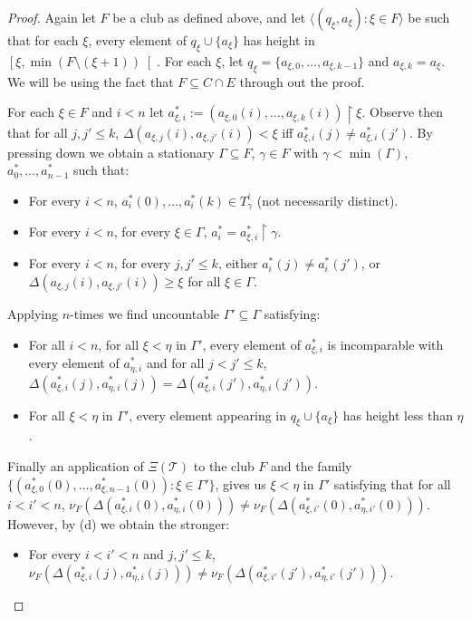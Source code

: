 \documentclass[10pt,a4paper]{amsart}
\theoremstyle{definition}
\newcommand{\seb}{\subseteq}
\newcommand{\setm}{\setminus}
\newcommand{\res}{\!\upharpoonright\!}
\newcommand{\tup}[1]{\langle#1\rangle}
\newcommand{\1}{\mathbf{1}}
\newcommand{\T}{\mathcal{T}}
\newcommand{\prop}{\Xi}
\begin{document}
\begin{proof}
  Again let $F$ be a club as defined above, and let
  $\tup{(q_{\xi},a_{\xi}) : \xi \in F}$ be such that
  for each $\xi$, every element of $q_{\xi} \cup \{a_{\xi}\}$ has height
  in $\left[\xi,\min(F\setm(\xi+1))\right[$. For each $\xi$,
  let $q_{\xi} = \{a_{\xi,0},\dots,a_{\xi,k-1}\}$ and
  $a_{\xi,k} = a_{\xi}$. We will be using the fact that
  $F \seb C \cap E$ through out the proof.

  For each $\xi \in F$ and $i < n$ let
  $a_{\xi,i}^{*} := (a_{\xi,0}(i),\dots,a_{\xi,k}(i))\res \xi$.
  Observe then that for all $j,j' \le k$,
  $\Delta(a_{\xi,j}(i),a_{\xi,j'}(i)) < \xi$ iff
  $a_{\xi,i}^{*}(j) \neq a_{\xi,i}^{*}(j')$. By pressing down
  we obtain a stationary $\Gamma \seb F$,
  $\gamma \in F$ with $\gamma < \min(\Gamma)$,
  $a^{*}_{0},\dots,a^{*}_{n-1}$ such that:
  \begin{itemize}
    \item[(a)] For every $i < n$, $a^{*}_{i}(0),\dots,a^{*}_{i}(k) \in
    T^{i}_{\gamma}$ (not necessarily distinct).
    \item[(b)] For every $i < n$, for every $\xi \in \Gamma$,
    $a^{*}_{i}  = a_{\xi,i}^{*}\res \gamma$.
    \item[(c)] For every $i < n$, for every $j,j' \le k$,
    either $a^{*}_{i}(j) \neq a^{*}_{i}(j')$, or
    $\Delta(a_{\xi,j}(i),a_{\xi,j'}(i)) \ge \xi$ for all
    $\xi \in \Gamma$.
  \end{itemize}
  Applying
   $n$-times we find uncountable
  $\Gamma' \seb \Gamma$ satisfying:
  \begin{itemize}
    \item[(d)] For all $i < n$, for all $\xi < \eta$ in $\Gamma'$,
    every element of $a^{*}_{\xi,i}$ is incomparable with every element
    of $a^{*}_{\eta,i}$ and for all $j < j' \le k$,
    $\Delta(a^{*}_{\xi,i}(j),a^{*}_{\eta,i}(j)) =
    \Delta(a^{*}_{\xi,i}(j'),a^{*}_{\eta,i}(j'))$.
    \item[(e)] For all $\xi < \eta$ in $\Gamma'$,
    every element appearing in $q_{\xi} \cup \{a_{\xi}\}$ has
    height less than $\eta$.
  \end{itemize}
  Finally an application of $\prop(\T)$ to the club $F$ and the family
  $\{(a^{*}_{\xi,0}(0),\dots,a^{*}_{\xi,n-1}(0)) : \xi \in \Gamma'\}$, gives us
  $\xi < \eta$ in $\Gamma'$ satisfying that for all $i < i' < n$,
  $\nu_{F}(\Delta(a^{*}_{\xi,i}(0),a^{*}_{\eta,i}(0))) \neq
  \nu_{F}(\Delta(a^{*}_{\xi,i'}(0),a^{*}_{\eta,i'}(0)))$. However, by
  (d) we obtain the stronger:
  \begin{itemize}
    \item[(f)] For every $i < i' < n$ and $j,j' \le k$,
    $\nu_{F}(\Delta(a^{*}_{\xi,i}(j),a^{*}_{\eta,i}(j))) \neq
    \nu_{F}(\Delta(a^{*}_{\xi,i'}(j'),a^{*}_{\eta,i'}(j')))$.
  \end{itemize}


\end{proof}
\end{document}
